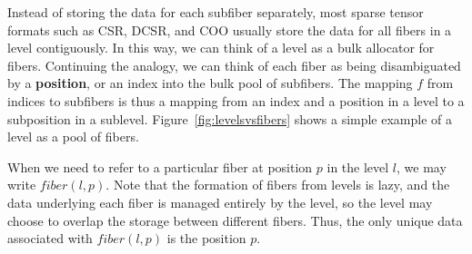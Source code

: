 Instead of storing the data for each subfiber separately, most sparse tensor
formats such as CSR, DCSR, and COO usually store the data for all fibers in a
level contiguously. In this way, we can think of a level as a bulk allocator for
fibers. Continuing the analogy, we can think of each fiber as being
disambiguated by a \textbf{position}, or an index into the bulk pool of
subfibers. The mapping $f$ from indices to subfibers is thus a mapping from an
index and a position in a level to a subposition in a sublevel.
Figure~\ref{fig:levelsvsfibers} shows a simple example of a level as a pool of fibers.

When we need to refer to a particular fiber at position $p$ in the level $l$, we
may write $fiber(l, p)$. Note that the formation of fibers from levels is lazy,
and the data underlying each fiber is managed entirely by the level, so the
level may choose to overlap the storage between different fibers. Thus, the only
unique data associated with $fiber(l, p)$ is the position $p$.

